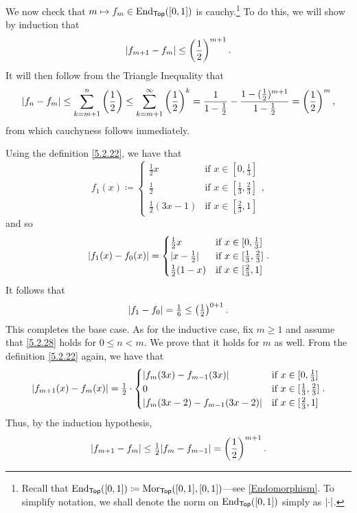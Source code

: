 \begin{exm}
\begin{savenotes}
We now check that $m\mapsto f_m\in \operatorname{End} _{\mathsf{Top}}([0,1])$ is cauchy.\footnote{Recall that $\operatorname{End} _{\mathsf{Top}}([0,1])\coloneqq \operatorname{Mor} _{\mathsf{Top}}([0,1],[0,1])$---see \cref{Endomorphism}.  To simplify notation, we shall denote the norm on $\operatorname{End} _{\mathsf{Top}}([0,1])$ simply as $\norm$.} To do this, we will show by induction that
\begin{equation}\label{5.2.28}
\norm[f_{m+1}-f_m]\leq \left( \frac{1}{2}\right) ^{m+1}.
\end{equation}
It will then follow from the Triangle Inequality that
\begin{equation}
\norm[f_n-f_m]\leq \sum _{k=m+1}^n\left( \frac{1}{2}\right) \leq \sum _{k=m+1}^\infty \left( \frac{1}{2}\right) ^k=\frac{1}{1-\tfrac{1}{2}}-\frac{1-(\tfrac{1}{2})^{m+1}}{1-\tfrac{1}{2}}=\left( \frac{1}{2}\right) ^m,
\end{equation}
from which cauchyness follows immediately.

Using the definition \eqref{5.2.22}, we have that
\begin{equation}
f_1(x)\coloneqq \begin{cases}\tfrac{1}{2}x & \text{if }x\in [0,\tfrac{1}{3}] \\ \tfrac{1}{2} & \text{if }x\in [\tfrac{1}{3},\tfrac{2}{3}] \\ \tfrac{1}{2}(3x-1) & \text{if }x\in [\tfrac{2}{3},1]\end{cases},
\end{equation}
and so
\begin{equation}
\left| f_1(x)-f_0(x)\right| =\begin{cases}\tfrac{1}{2}x & \text{if }x\in [0,\tfrac{1}{3}] \\ \lvert x-\tfrac{1}{2}\rvert & \text{if }x\in [\tfrac{1}{3},\tfrac{2}{3}] \\ \tfrac{1}{2}(1-x) & \text{if }x\in [\tfrac{2}{3},1]\end{cases}.
\end{equation}
It follows that
\begin{equation}
\norm[f_1-f_0]=\tfrac{1}{6}\leq \left( \tfrac{1}{2}\right) ^{0+1}.
\end{equation}
This completes the base case.  As for the inductive case, fix $m\geq 1$ and assume that \eqref{5.2.28} holds for $0\leq n<m$.  We prove that it holds for $m$ as well.  From the definition \eqref{5.2.22} again, we have that
\begin{equation}
\lvert f_{m+1}(x)-f_m(x)\rvert=\tfrac{1}{2}\cdot \begin{cases}\lvert f_m(3x)-f_{m-1}(3x)\rvert & \text{if }x\in [0,\tfrac{1}{3}] \\ 0 & \text{if }x\in [\tfrac{1}{3},\tfrac{2}{3}] \\ \lvert f_m(3x-2)-f_{m-1}(3x-2)\rvert & \text{if }x\in [\tfrac{2}{3},1]\end{cases}.
\end{equation}
Thus, by the induction hypothesis,
\begin{equation}
\norm[f_{m+1}-f_m]\leq \tfrac{1}{2}\norm[f_m-f_{m-1}]=\left( \frac{1}{2}\right) ^{m+1}.
\end{equation}


\end{savenotes}
\end{exm}
